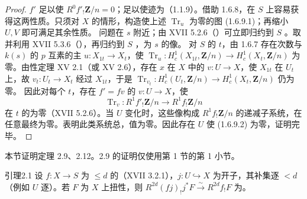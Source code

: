 \begin{proof}
$f'$ 足以使 $R^0f'_!\mathbf Z/n=0$；足以使迹为（1.1.9）。借助 1.6.8，在 $S$ 上容易获得这两性质。只须对 $X$ 的情形，构造使上述 $\operatorname{Tr}_u$ 为零的图 (1.6.9.1)；再缩小 $U,V$ 即可满足其余性质。
问题在 $s$ 附近；由 XVII 5.2.6（）可立即归约到 $S$ 。取并利用 XVII 5.3.6（），再归约到 $S$ ，为 $s$ 的像。
对 $S$ 的 $t$，由 1.6.7 存在次数与 $k(s)$ 的 $p$ 互素的主 $u:X_{1t}\to X_t$，使 $\operatorname{Tr}_u:H_c^1(X_{1t},\mathbf Z/n)\to H_c^1(X_t,\mathbf Z/n)$ 为零。由性定理 XV 2.1（或 XV 2.6），存在 $x$ 在 $X$ 中的 $v:U\to X$，使 $X_{1t}$ 在 $U_t$ 上，故 $v_t:U_t\to X_t$ 经过 $X_{1t}$，于是 $\operatorname{Tr}_{v_t}:H_c^1(U_t,\mathbf Z/n)\to H_c^1(X_t,\mathbf Z/n)$ 仍为零。
因此对每个 $t$，存在 $f'=fv$ 的 $v:U\to X$，使
\[\operatorname{Tr}_v:R^1f'_!\mathbf Z/n\to R^1f_!\mathbf Z/n\tag{1.6.9.2}\]
在 $t$ 的为零（XVII 5.2.6）。当 $U$ 变化时，这些像构成 $R^1f_!\mathbf Z/n$ 的递减子系统，在任意最终为零。表明此类系统总，值为零。因此存在 $U$ 使 (1.6.9.2) 为零，证明完毕。
\end{proof}
本节证明定理 2.9、2.12。2.9 的证明仅使用第 1 节的第 1 小节。
\begin{SGAresult}{引理}{2.1}
设 $f:X\to S$ 为 $\le d$ 的（XVII 3.2.1），$j:U\hookrightarrow X$ 为开子，其补集逐 $<d$（例如 $U$ 逐）。若 $F$ 为 $X$ 上扭性，则 $R^{2d}(fj)_!j^*F\xrightarrow\sim R^{2d}f_!F$ 为。
\end{SGAresult}
